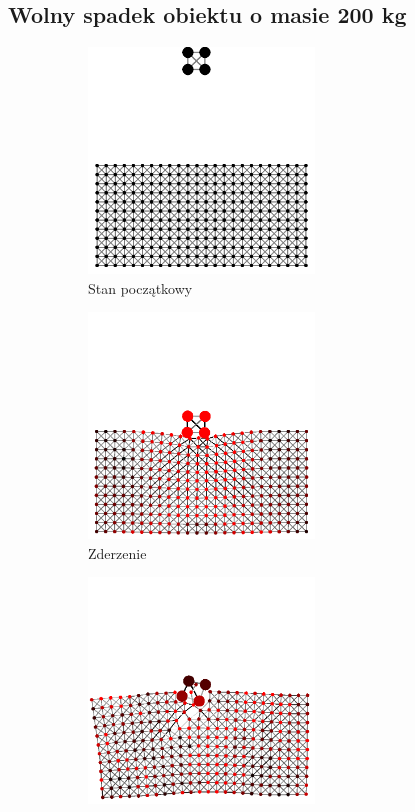 \documentclass[12pt, letterpaper]{report}
\begin{document}
    \newpage
    \subsection{Wolny spadek obiektu o masie 200 kg}
    \begin{figure}[h]

        \begin{subfigure}{0.5\textwidth}
            \centering
            \includegraphics[width=6cm, height=6cm]{collision_2x2_24x12_mass50_1} 
            \caption{Stan początkowy}
        \end{subfigure}
        \begin{subfigure}{0.5\textwidth}
            \centering
            \includegraphics[width=6cm, height=6cm]{collision_2x2_24x12_mass50_2}
            \caption{Zderzenie}
        \end{subfigure}
        \begin{subfigure}{0.5\textwidth}
            \centering
            \includegraphics[width=6cm, height=6cm]{collision_2x2_24x12_mass50_3}

\end{subfigure}
\end{figure}
\end{document}

